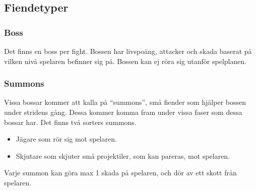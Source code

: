 \documentclass{TDP005mall}
\begin{document}
\subsection{Fiendetyper}
\subsubsection{Boss}
Det finns en boss per fight. Bossen har livspoäng, attacker och skada baserat på
vilken nivå spelaren befinner sig på. Bossen kan ej röra sig utanför spelplanen.
\subsubsection{Summons}
Vissa bossar kommer att kalla på \enquote{summons}, små fiender som hjälper bossen
under stridens gång. Dessa kommer komma fram under vissa faser som dessa bossar har.
Det finns två sorters summons.
\begin{itemize}
  \item Jägare som rör sig mot spelaren.
  \item Skjutare som skjuter små projektiler, som kan pareras, mot spelaren.
\end{itemize}
Varje summon kan göra max 1 skada på spelaren, och dör av ett skott från spelaren.
\end{document}
